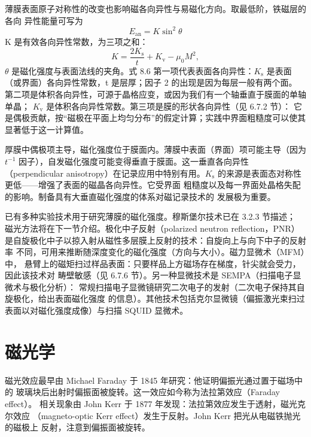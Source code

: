 薄膜表面原子对称性的改变也影响磁各向异性与易磁化方向。取最低阶，铁磁层的各向
异性能量可写为
\begin{equation*}
E_{\mathrm{an}} = K\sin^{2}\theta\tag{8.5}
\end{equation*}
K 是有效各向异性常数，为三项之和：
\begin{equation*}
K = \frac{2K_{\mathrm{s}}}{t} + K_{\mathrm{v}} - \mu_0M^{2},\tag{8.6}
\end{equation*}
$\theta$ 是磁化强度与表面法线的夹角。式 8.6 第一项代表表面各向异性：$K_{\mathrm{s}}$
是表面（或界面）各向异性常数，t 是层厚；因子 2 的出现是因为每层一般有两个面。
第二项是体积各向异性，可源于晶格应变，或因为我们有一个轴垂直于膜面的单轴单晶；
$K_{\mathrm{v}}$ 是体积各向异性常数。第三项是膜的形状各向异性（见 6.7.2 节）：
它是偶极贡献，按“磁极在平面上均匀分布”的假定计算；实践中界面粗糙度可以使其
显著低于这一计算值。

厚膜中偶极项主导，磁化强度位于膜面内。薄膜中表面（界面）项可能主导（因为
$t^{-1}$ 因子），自发磁化强度可能变得垂直于膜面。这一垂直各向异性（perpendicular
anisotropy）在记录应用中特别有用。$K_{\mathrm{s}}$ 的来源是表面态对称性更低——增强了表面的磁晶各向异性。它受界面
粗糙度以及每一界面处晶格失配的影响。制备具有大垂直磁化强度的体系对磁记录技术的
发展极为重要。

已有多种实验技术用于研究薄膜的磁化强度。穆斯堡尔技术已在 3.2.3 节描述；
磁光方法将在下一节介绍。极化中子反射（polarized neutron reflection，PNR）
是自旋极化中子以掠入射从磁性多层膜上反射的技术：自旋向上与向下中子的反射率
不同，可用来推断随深度变化的磁化强度（方向与大小）。磁力显微术（MFM）中，
悬臂上的磁矩扫过样品表面：只要样品上方磁场存在梯度，针尖就会受力，因此该技术对
畴壁敏感（见 6.7.6 节）。另一种显微技术是 SEMPA（扫描电子显微术与极化分析）：
常规扫描电子显微镜研究二次电子的发射（二次电子保持其自旋极化，给出表面磁化强度
的信息）。其他技术包括克尔显微镜（偏振激光束扫过表面以对磁化强度成像）与扫描
SQUID 显微术。

\section{磁光学}

磁光效应最早由 Michael Faraday 于 1845 年研究：他证明偏振光通过置于磁场中的
玻璃块后出射时偏振面被旋转。这一效应如今称为法拉第效应（Faraday effect）。
相关现象由 John Kerr 于 1877 年发现：法拉第效应发生于透射，磁光克尔效应
（magneto-optic Kerr effect）发生于反射。John Kerr 把光从电磁铁抛光的磁极上
反射，注意到偏振面被旋转。


